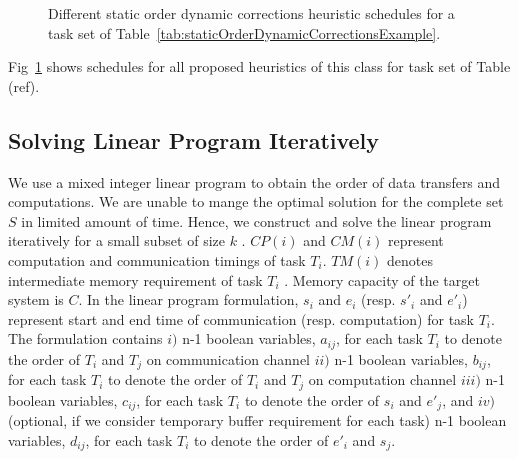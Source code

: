 \documentclass[runningheads]{llncs} %
\begin{document}
\begin{figure}[htb]
	\caption{ \label{fig:staticOrderDynamicCorrectionsExample} Different static order dynamic corrections heuristic schedules for a task set of Table~\ref{tab:staticOrderDynamicCorrectionsExample}.}
\end{figure} 



Fig~\ref{fig:staticOrderDynamicCorrectionsExample} shows schedules for all proposed heuristics of this class for task set of Table (ref).




\subsection{Solving Linear Program Iteratively}
\label{subsec:linearprogrammingformulation}
We use a mixed integer linear program  to obtain the order of data transfers and computations. We are unable to mange the optimal solution for the complete set $S$ in limited amount of time.  Hence, we construct and solve the linear program iteratively for a small subset of size $k$ . $CP(i)$ and $CM(i)$ represent computation and communication timings of task $T_i$. $TM(i)$ denotes intermediate memory requirement of task $T_i$ . Memory capacity of the  target system is $C$. In the linear program formulation, $s_i$ and $e_i$ (resp. $s'_i$ and $e'_i$) represent start and end time of communication (resp. computation) for task $T_i$. The formulation contains $i)$ n-1 boolean variables, $a_{ij}$, for each task $T_i$ to denote the order of $T_i$ and $T_j$  on communication channel   $ii)$ n-1 boolean variables, $b_{ij}$, for each task $T_i$ to denote the order of $T_i$ and $T_j$  on computation channel $iii)$ n-1 boolean variables, $c_{ij}$, for each task $T_i$ to denote the order of $s_i$ and $e'_j$, and $iv)$ (optional, if we consider temporary buffer requirement for each task) n-1 boolean variables, $d_{ij}$, for each task $T_i$ to denote the order of $e'_i$ and $s_j$.
\end{document}
